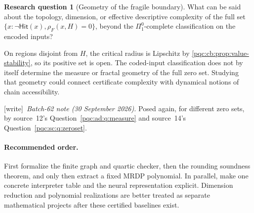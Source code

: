 \documentclass[11pt,letterpaper]{article}
\numberwithin{equation}{section}
\theoremstyle{definition}
\newtheorem{question}{Research question}
\theoremstyle{remark}
\newcommand{\wtag}{\textup{[write]}}
\newcommand{\Hit}{\mathsf{Hit}}
\begin{document}
\begin{question}[Geometry of the fragile boundary]\label{pqc:cb:q:boundary}
What can be said about the topology, dimension, or effective descriptive
complexity of the full set $\{x:\neg\Hit(x),\rho_F(x,H)=0\}$, beyond the
$\Pi^0_1$-complete classification on the encoded inputs?
\end{question}
On regions disjoint from $H$, the critical radius is Lipschitz by
\cref{pqc:cb:prop:value-stability}, so its positive set is open.  The coded-input
classification does not by itself determine the measure or fractal geometry
of the full zero set.  Studying that geometry could connect certificate
complexity with dynamical notions of chain accessibility.
\par\noindent\wtag\ \emph{Batch-62 note (30 September 2026).} Posed again, for different zero sets, by source~12's
Question~\ref{pqc:ad:q:measure} and source~14's
Question~\ref{pqc:sc:q:zeroset}.

\paragraph{Recommended order.}
First formalize the finite graph and quartic checker, then the rounding
soundness theorem, and only then extract a fixed MRDP polynomial.  In parallel,
make one concrete interpreter table and the neural representation explicit.
Dimension reduction and polynomial realizations are better treated as
separate mathematical projects after these certified baselines exist.
\end{document}
